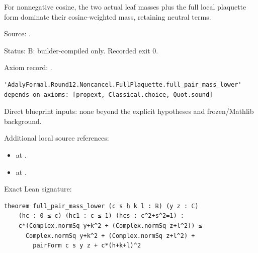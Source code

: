 \begin{theorem}[bp-209]
\label{bp-209}
\uses{}
\leanok
For nonnegative cosine, the two actual leaf masses plus the full local plaquette form dominate their cosine-weighted mass, retaining neutral terms.

\par Source: \texttt{}.
\par Status: B: builder-compiled only. Recorded exit 0.
\par Axiom record: \texttt{}.
\begin{verbatim}
'AdalyFormal.Round12.Noncancel.FullPlaquette.full_pair_mass_lower' depends on axioms: [propext, Classical.choice, Quot.sound]
\end{verbatim}
\par Direct blueprint inputs: none beyond the explicit hypotheses and frozen/Mathlib background.
\par Additional local source references:
\begin{itemize}
\item \texttt{} at \texttt{}.
\item \texttt{} at \texttt{}.
\end{itemize}
\par Exact Lean signature:
\begin{verbatim}
theorem full_pair_mass_lower (c s h k l : ℝ) (y z : ℂ)
    (hc : 0 ≤ c) (hc1 : c ≤ 1) (hcs : c^2+s^2=1) :
    c*(Complex.normSq y+k^2 + (Complex.normSq z+l^2)) ≤
      Complex.normSq y+k^2 + (Complex.normSq z+l^2) +
        pairForm c s y z + c*(h+k+l)^2
\end{verbatim}
\end{theorem}

